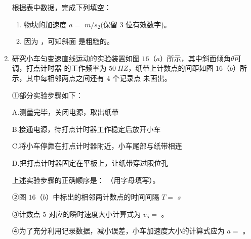 \begin{enumerate}
根据表中数据，完成下列填空：
\begin{enumerate}
\renewcommand{\labelenumi}{\arabic{enumi}.}
\item 
物块的加速度 $ a= $
$ m/s_{2} $(保留 $ 3 $ 位有效数字)。

\item 
因为
，可知斜面
是粗糙的。




\end{enumerate}


\banswer{

}


\newpage
\item 
{}
研究小车匀变速直线运动的实验装置如图 $ 16 $（$ a $）所示，其中斜面倾角$ \theta $可调，打点计时器
的工作频率为 $ 50 \ HZ $，纸带上计数点的间距如图 $ 16 $（$ b $）所示，其中每相邻两点之间还有 $ 4 $ 个记录点
未画出。
\begin{figure}[h!]
\centering

\end{figure}



①部分实验步骤如下：

A.测量完毕，关闭电源，取出纸带




B.接通电源，待打点计时器工作稳定后放开小车



C.将小车停靠在打点计时器附近，小车尾部与纸带相连



D.把打点计时器固定在平板上，让纸带穿过限位孔



上述实验步骤的正确顺序是：  （用字母填写）。



②图 $ 16 $（$ b $）中标出的相邻两计数点的时间间隔 $ T= $
$ s $

③计数点 $ 5 $ 对应的瞬时速度大小计算式为 $ v_5= $
。

④为了充分利用记录数据，减小误差，小车加速度大小的计算式应为 $ a= $  。




\end{enumerate}
